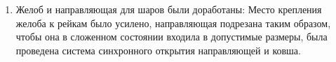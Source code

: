 \begin{enumerate}
\begin{enumerate}
		\item Желоб и направляющая для шаров были доработаны: Место крепления желоба к рейкам было усилено, направляющая подрезана таким образом, чтобы она в сложенном состоянии входила в допустимые размеры, была проведена система синхронного открытия направляющей и ковша.
		\begin{figure}[H]
			\begin{minipage}[h]{0.26\linewidth}
			\end{minipage}
			\hfill
			\begin{minipage}[h]{0.24\linewidth}
			\end{minipage}
			\hfill
			\begin{minipage}[h]{0.24\linewidth}

\end{minipage}
\end{figure}
\end{enumerate}
\end{enumerate}
